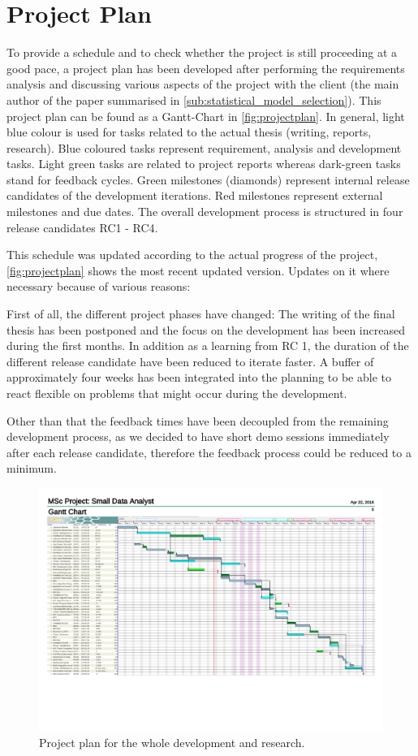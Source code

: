 \section{Project Plan}
\label{sec:projectplan}
To provide a schedule and to check whether the project is still proceeding at a good pace, a project plan has been developed after performing the requirements analysis and discussing various aspects of the project with the client (the main author of the paper summarised in \autoref{sub:statistical_model_selection}). This project plan can be found as a Gantt-Chart in \autoref{fig:projectplan}. In general, light blue colour is used for tasks related to the actual thesis (writing, reports, research). Blue coloured tasks represent requirement, analysis and development tasks. Light green tasks are related to project reports whereas dark-green tasks stand for feedback cycles. Green milestones (diamonds) represent internal release candidates of the development iterations. Red milestones represent external milestones and due dates. The overall development process is structured in four release candidates RC1 - RC4. 

This schedule was updated according to the actual progress of the project, \autoref{fig:projectplan} shows the most recent updated version. Updates on it where necessary because of various reasons:

First of all, the different project phases have changed: The writing of the final thesis has been postponed and the focus on the development has been increased during the first months. In addition as a learning from RC 1, the duration of the different release candidate have been reduced to iterate faster. A buffer of approximately four weeks has been integrated into the planning to be able to react flexible on problems that might occur during the development. 

Other than that the feedback times have been decoupled from the remaining development process, as we decided to have short demo sessions immediately after each release candidate, therefore the feedback process could be reduced to a minimum.

\begin{figure}
	\centering
	\includegraphics[width=\textwidth]{appendix/Projectplan}
	\caption{Project plan for the whole development and research.}
	\label{fig:projectplan}
\end{figure}
\restoregeometry